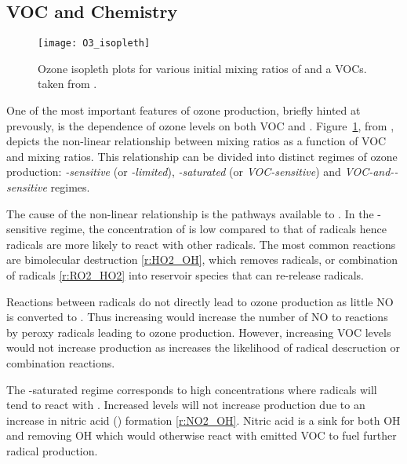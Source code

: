 \subsection[VOC and NOx Chemistry]{VOC and  Chemistry} \label{ss:VOC&NOx}
\begin{figure}
	\begin{center}
        \caption[Ozone mixing ratios as a function of  and VOC]{Ozone isopleth plots for various initial mixing ratios of  and a VOCs. taken from \citet{Jenkin:2000}.}
        \texttt{[image: O3\_isopleth]}
		\label{f:O3_isopleth}
	\end{center}
\end{figure}
One of the most important features of ozone production, briefly hinted at prevously, is the dependence of ozone levels on both VOC and .
Figure~\ref{f:O3_isopleth}, from \citet{Jenkin:2000}, depicts the non-linear relationship between  mixing ratios as a function of VOC and  mixing ratios.  
This relationship can be divided into distinct regimes of ozone production: \emph{-sensitive} (or \emph{-limited}), \emph{-saturated} (or \emph{VOC-sensitive}) and \emph{VOC-and--sensitive} regimes. 

The cause of the non-linear relationship is the pathways available to .
In the -sensitive regime, the concentration of  is low compared to that of radicals hence radicals are more likely to react with other radicals. 
The most common reactions are bimolecular destruction \eqref{r:HO2_OH}, which removes radicals, or combination of radicals \eqref{r:RO2_HO2} into reservoir species that can re-release radicals.
\begin{rxnarray}
     \rightarrow {} \label{r:HO2_OH}
\end{rxnarray}

Reactions between radicals do not directly lead to ozone production as little NO is converted to .
Thus increasing  would increase the number of NO to  reactions by peroxy radicals leading to ozone production.
However, increasing VOC levels would not increase  production as increases the likelihood of radical descruction or combination reactions.

The -saturated regime corresponds to high  concentrations where radicals will tend to react with . 
Increased  levels will not increase  production due to an increase in nitric acid () formation \eqref{r:NO2_OH}.
Nitric acid is a sink for both OH and  removing OH which would otherwise react with emitted VOC to fuel further radical production.
\begin{rxnarray}
     \rightarrow {} \label{r:NO2_OH}
\end{rxnarray}

